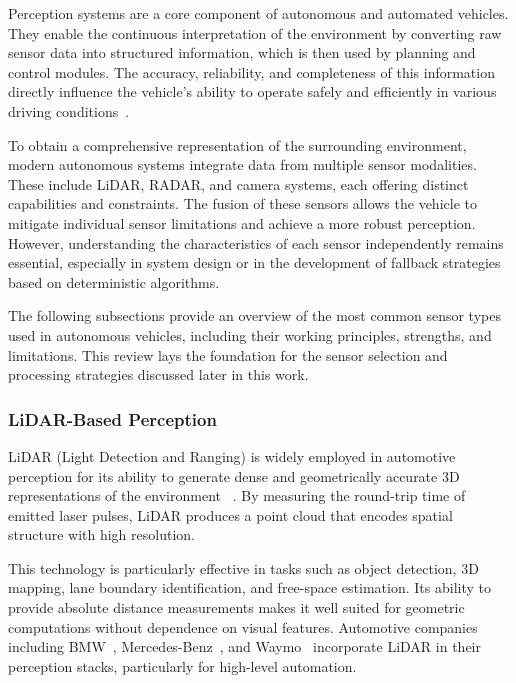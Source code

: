 Perception systems are a core component of autonomous and automated vehicles. They enable the continuous 
interpretation of the environment by converting raw sensor data into structured information, which is then used by planning and control modules. The accuracy, reliability, and completeness of this 
information directly influence the vehicle's ability to operate safely and efficiently in various driving 
conditions~\cite{autonomous_vehicles_perception_survey}.

To obtain a comprehensive representation of the surrounding environment, modern autonomous systems integrate 
data from multiple sensor modalities. These include LiDAR, RADAR, and camera systems, each offering distinct 
capabilities and constraints. The fusion of these sensors allows the vehicle to mitigate individual 
sensor limitations and achieve a more robust perception. However, understanding the characteristics 
of each sensor independently remains essential, especially in system design or in the development 
of fallback strategies based on deterministic algorithms.

The following subsections provide an overview of the most common sensor types used in autonomous 
vehicles, including their working principles, strengths, and limitations. This review lays the 
foundation for the sensor selection and processing strategies discussed later in this work.

\subsubsection{LiDAR-Based Perception}

LiDAR (Light Detection and Ranging) is widely employed in automotive perception for its ability 
to generate dense and geometrically accurate 3D representations of the environment 
~\cite{autonomous_vehicles_perception_survey}. By measuring the round-trip time of emitted laser pulses, 
LiDAR produces a point cloud that encodes spatial structure with high resolution.

This technology is particularly effective in tasks such as object detection, 3D mapping, lane boundary 
identification, and free-space estimation. Its ability to provide absolute distance measurements makes 
it well suited for geometric computations without dependence on visual features. Automotive companies 
including BMW~\cite{lidarbased_bmw}, Mercedes-Benz~\cite{lidarbased_mercedes}, and Waymo~\cite{lidarbased_waymo} 
incorporate LiDAR in their perception stacks, particularly for high-level automation.

